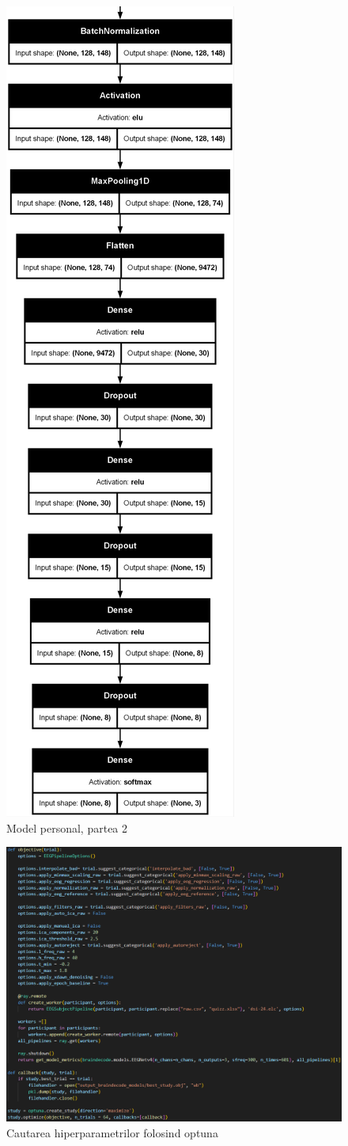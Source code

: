 \begin{figure}
    \centering
    \includegraphics[width=0.4\linewidth]{model_part2.png}
    \caption{Model personal, partea 2}
    \label{fig:model_part2}
\end{figure}

\begin{figure}
    \centering
    \includegraphics[width=1\linewidth]{optuna_study.png}
    \caption{Cautarea hiperparametrilor folosind optuna}
    \label{fig:optuna_search}
\end{figure}